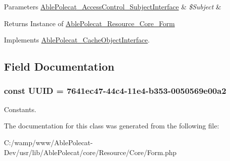\begin{DoxyParams}[1]{Parameters}
\hyperlink{interface_able_polecat___access_control___subject_interface}{Able\+Polecat\+\_\+\+Access\+Control\+\_\+\+Subject\+Interface} & {\em \$\+Subject} & \\
\hline
\end{DoxyParams}
\begin{DoxyReturn}{Returns}
Instance of \hyperlink{class_able_polecat___resource___core___form}{Able\+Polecat\+\_\+\+Resource\+\_\+\+Core\+\_\+\+Form} 
\end{DoxyReturn}


Implements \hyperlink{interface_able_polecat___cache_object_interface_a3f2135f6ad45f51d075657f6d20db2cd}{Able\+Polecat\+\_\+\+Cache\+Object\+Interface}.



\subsection{Field Documentation}
\hypertarget{class_able_polecat___resource___core___form_a74b892c8c0b86bf9d04c5819898c51e7}{}
\subsubsection[{U\+U\+I\+D}]{\setlength{\rightskip}{0pt plus 5cm}const U\+U\+I\+D = \textquotesingle{}7641ec47-\/44c4-\/11e4-\/b353-\/0050569e00a2\textquotesingle{}}\label{class_able_polecat___resource___core___form_a74b892c8c0b86bf9d04c5819898c51e7}
Constants. 

The documentation for this class was generated from the following file\+:\begin{DoxyCompactItemize}
\item 
C\+:/wamp/www/\+Able\+Polecat-\/\+Dev/usr/lib/\+Able\+Polecat/core/\+Resource/\+Core/Form.\+php\end{DoxyCompactItemize}
